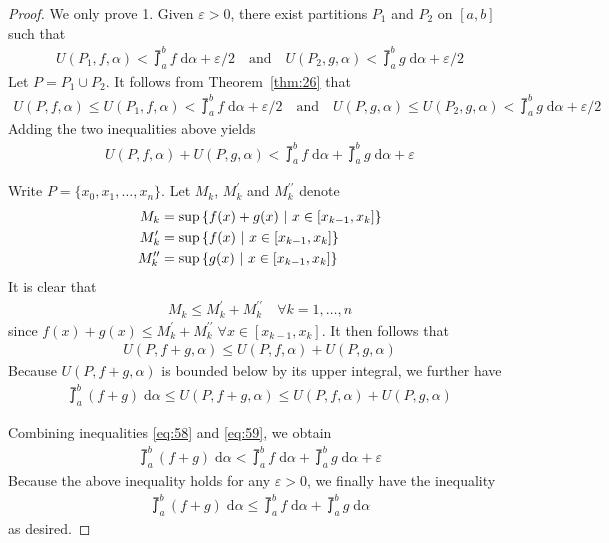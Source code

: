 \documentclass[thmcnt=section, 12pt]{my-elegantbook}
\begin{document}
\begin{proof}
    We only prove 1. Given $\varepsilon > 0$, there exist partitions $P_1$ and $P_2$ on $[a, b]$ such that
    \begin{align*}
        U(P_1,f,\alpha) < \upint_a^b f \; \mathrm{d}\alpha + \varepsilon/2
        \quad \text{and} \quad
        U(P_2,g,\alpha) < \upint_a^b g \; \mathrm{d}\alpha + \varepsilon/2
    \end{align*}
    Let $P = P_1 \cup P_2$. It follows from Theorem~\ref{thm:26} that
    \begin{align*}
        U(P,f,\alpha) \leq U(P_1,f,\alpha) < \upint_a^b f \; \mathrm{d}\alpha + \varepsilon/2
        \quad \text{and} \quad
        U(P,g,\alpha) \leq U(P_2,g,\alpha) < \upint_a^b g \; \mathrm{d}\alpha + \varepsilon/2
    \end{align*}
    Adding the two inequalities above yields
    \begin{align}
        U(P,f,\alpha) + U(P,g,\alpha)
        < \upint_a^b f \; \mathrm{d}\alpha +  \upint_a^b g \; \mathrm{d}\alpha + \varepsilon
        \label{eq:58}
    \end{align}

    Write $P=\{ x_0, x_1, \ldots, x_n \}$. Let $M_k$, $M_k^\prime$ and $M_k^{\prime\prime}$ denote
    \begin{align*}
        M_k                & = \sup \left\{ f(x) + g(x) \ \middle| \ x \in [x_{k-1}, x_k] \right\} \\
        M_k^\prime         & = \sup \left\{ f(x) \ \middle| \ x \in [x_{k-1}, x_k] \right\}        \\
        M_k^{\prime\prime} & = \sup \left\{ g(x) \ \middle| \ x \in [x_{k-1}, x_k] \right\}
    \end{align*}
    It is clear that
    \begin{align*}
        M_k \leq M_k^\prime + M_k^{\prime\prime}
        \quad \forall k = 1, \ldots, n
    \end{align*}
    since $f(x) + g(x) \leq M_k^\prime + M_k^{\prime\prime} \; \forall x \in [x_{k-1}, x_k]$. It then follows that
    \begin{align*}
        U(P,f+g,\alpha) \leq U(P,f,\alpha) + U(P,g,\alpha)
    \end{align*}
    Because $U(P,f+g,\alpha)$ is bounded below by its upper integral, we further have
    \begin{align}
        \upint_a^b (f+g) \; \mathrm{d}\alpha
        \leq U(P,f+g,\alpha) \leq U(P,f,\alpha) + U(P,g,\alpha)
        \label{eq:59}
    \end{align}

    Combining inequalities \eqref{eq:58} and \eqref{eq:59}, we obtain
    \begin{align*}
        \upint_a^b (f+g) \; \mathrm{d}\alpha
        < \upint_a^b f \; \mathrm{d}\alpha +  \upint_a^b g \; \mathrm{d}\alpha + \varepsilon
    \end{align*}
    Because the above inequality holds for any $\varepsilon > 0$, we finally have the inequality
    \begin{align*}
        \upint_a^b (f+g) \; \mathrm{d}\alpha
        \leq \upint_a^b f \; \mathrm{d}\alpha +  \upint_a^b g \; \mathrm{d}\alpha
    \end{align*}
    as desired.
\end{proof}
\end{document}
